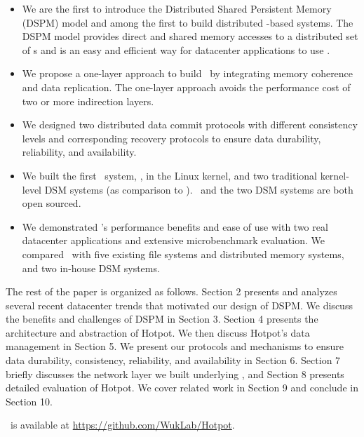 \begin{itemize}
\item We are the first to introduce the Distributed Shared Persistent Memory (DSPM) model
and among the first to build distributed \nvm-based systems.
The DSPM model provides direct and shared memory accesses to a distributed set of \nvm{}s 
and is an easy and efficient way for datacenter applications to use \nvm.

\item We propose a one-layer approach to build \dsnvm\ by 
integrating memory coherence and data replication.
The one-layer approach avoids the performance cost of two or more indirection layers.

\item We designed two distributed data commit protocols with different consistency levels 
and corresponding recovery protocols to 
ensure data durability, reliability, and availability.

\item We built the first \dsnvm\ system, \hotpot, in the Linux kernel, 
and two traditional kernel-level DSM systems (as comparison to \hotpot). 
\hotpot\ and the two DSM systems are both open sourced.

\item We demonstrated \hotpot's performance benefits and ease of use with two real datacenter applications
and extensive microbenchmark evaluation. 
We compared \hotpot\ with five existing file systems and distributed memory systems, 
and two in-house DSM systems.

\end{itemize}

The rest of the paper is organized as follows.
Section 2 presents and analyzes several recent datacenter trends that motivated our design of DSPM.
We discuss the benefits and challenges of DSPM in Section 3.
Section 4 presents the architecture and abstraction of Hotpot.
We then discuss Hotpot's data management in Section 5.
We present our protocols and mechanisms to ensure data durability, consistency, reliability, and availability in Section 6.
Section 7 briefly discusses the network layer we built underlying \hotpot,
and Section 8 presents detailed evaluation of Hotpot.
We cover related work in Section 9 and conclude in Section 10.

\hotpot\ is available at \url{https://github.com/WukLab/Hotpot}.